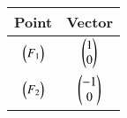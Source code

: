 \begin{tabular}[12pt]{ |c| c|}
    \hline
    \textbf{Point} & \textbf{Vector}\\ 
    \hline
    $\begin{pmatrix}F_1\end{pmatrix}$ &  $\begin{pmatrix}1\\0\end{pmatrix}$\\
    \hline
    $\begin{pmatrix}F_2\end{pmatrix}$ &   $\begin{pmatrix}-1\\0\end{pmatrix}$\\
    \hline
    \end{tabular}